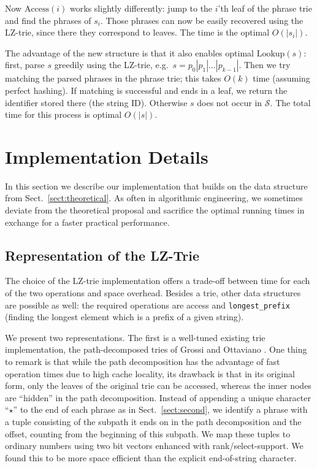 \documentclass{llncs}
\newcommand{\strings}{\ensuremath{\mathcal{S}}}
\newcommand{\lookup}{\ensuremath{\text{Lookup}}}
\newcommand{\access}{\ensuremath{\text{Access}}}
\begin{document}
Now $\access(i)$ works slightly differently: jump to the $i$'th leaf of the phrase trie and find the phrases of $s_i$. Those phrases can now be easily recovered using the LZ-trie, since there they correspond to leaves. The time is the optimal $O(|s_i|)$.

The advantage of the new structure is that it also enables optimal $\lookup(s)$: first, parse $s$ greedily using the LZ-trie, e.g.~$s=p_0|p_1|\dots|p_{k-1}|$. Then we try matching the parsed phrases in the phrase trie; this takes $O(k)$ time (assuming perfect hashing). If matching is successful and ends in a leaf, we return the identifier stored there (the string ID). Otherwise $s$ does not occur in $\strings$. The total time for this process is optimal $O(|s|)$.

\section{Implementation Details}
\label{sect:implementation}

In this section we describe our implementation that builds on the data structure from Sect.~\ref{sect:theoretical}. As often in algorithmic engineering, we sometimes deviate from the theoretical proposal and sacrifice the optimal running times in exchange for a faster practical performance.

\subsection{Representation of the LZ-Trie}
The choice of the LZ-trie implementation offers a trade-off between time for each of the two operations and space overhead. Besides a trie, other data structures are possible as well: the required operations are access and \verb|longest_prefix| (finding the longest element which is a prefix of a given string).

We present two representations. The first is a well-tuned existing trie implementation, the path-decomposed tries of Grossi and Ottaviano \cite{grossi12fast}. One thing to remark is that while the path decomposition has the advantage of fast operation times due to high cache locality, its drawback is that in its original form, only the leaves of the original trie can be accessed, whereas the inner nodes are ``hidden'' in the path decomposition.
Instead of
appending a unique character ``$\star$'' to the end of each phrase as in Sect.~\ref{sect:second},
we identify a phrase with a tuple consisting of the subpath it ends on in the path decomposition and the offset, counting from the beginning of this subpath. We map these tuples to ordinary numbers using two bit vectors enhanced with rank/select-support.
We found this to be more space efficient than the explicit end-of-string character.
\end{document}
